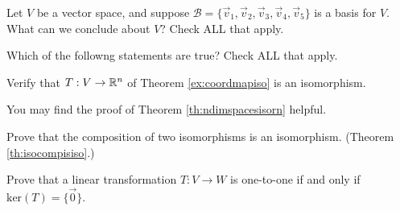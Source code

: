 \documentclass{ximera}
\begin{document}
\begin{problem}\label{prob:chooseisospace}
Let $V$ be a vector space, and suppose $\mathcal{B}=\{\vec{v}_1, \vec{v}_2, \vec{v}_3, \vec{v}_4, \vec{v}_5\}$ is a basis for $V$.  What can we conclude about $V$?  Check ALL that apply.
\begin{selectAll}
  \end{selectAll}
\end{problem}

\begin{problem}\label{prob:pickisospaces} Which of the followng statements are true? Check ALL that apply.
\begin{selectAll}
    \end{selectAll}
\end{problem}

\begin{problem}\label{prob:verifyisomorphism}
Verify that $T:V\rightarrow \mathbb{R}^n$ of Theorem \ref{ex:coordmapiso} is an isomorphism.
\begin{hint}
You may find the proof of Theorem \ref{th:ndimspacesisorn} helpful.
\end{hint}
\end{problem}

\begin{problem}\label{prob:isocompisisoproof}
Prove that the composition of two isomorphisms is an isomorphism.  (Theorem \ref{th:isocompisiso}.)
\end{problem}

\begin{problem} \label{prob:kerneliszero}
Prove that a linear transformation $T:V\rightarrow W$ is one-to-one if and only if $\text{ker}(T)=\{\vec{0}\}$.
\end{problem}
\end{document}
